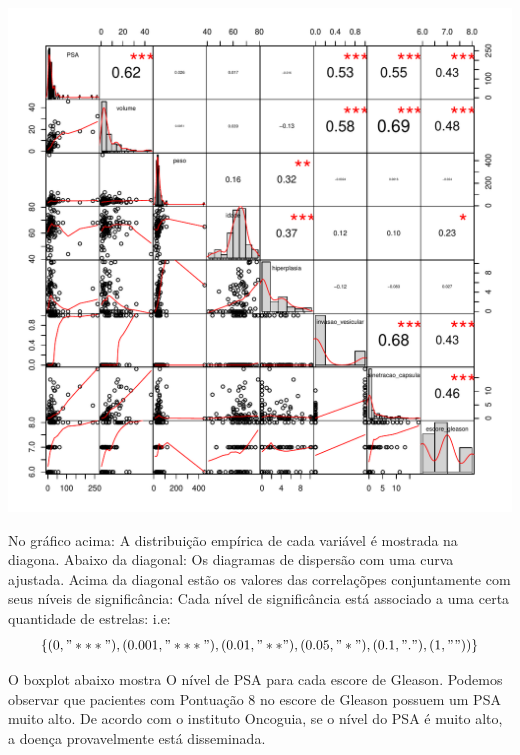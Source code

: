 \documentclass[runningheads]{llncs}\usepackage[]{graphicx}\usepackage[]{color}
\makeatletter
\def\maxwidth{ %
  \ifdim\Gin@nat@width>\linewidth
    \linewidth
  \else
    \Gin@nat@width
  \fi
}
\newenvironment{knitrout}{}{} %
\makeatother
\begin{document}
\begin{knitrout}
\color{fgcolor}
\includegraphics[width=\maxwidth]{figure/unnamed-chunk-8-1} 

\end{knitrout}
\newpage
No gráfico acima:
A distribuição empírica de cada variável é mostrada na diagona.
Abaixo da diagonal: Os diagramas de dispersão com uma curva ajustada.
Acima da diagonal estão os valores das correlaçõpes conjuntamente com seus níveis de significância:
Cada nível de significância está associado a uma certa quantidade de estrelas: i.e:$$\{(0, "***"),(0.001,"***"), (0.01,"**"), (0.05,"*"), (0.1,"."), (1,""))   \}$$

O boxplot abaixo mostra O nível de PSA para cada escore de Gleason.
Podemos observar que pacientes com Pontuação 8 no escore de Gleason possuem um PSA muito alto. De acordo com o instituto Oncoguia, se o nível do PSA é muito alto, a doença provavelmente está disseminada.
\\
\\
\end{document}

